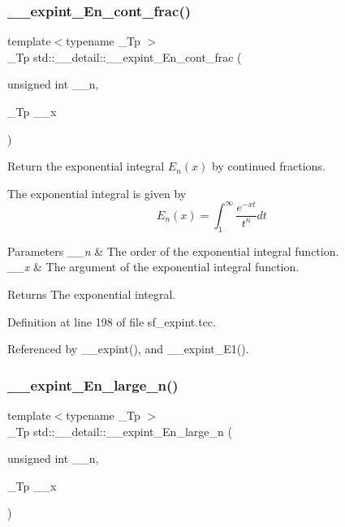 \subsubsection{\texorpdfstring{\+\_\+\+\_\+expint\+\_\+\+En\+\_\+cont\+\_\+frac()}{\_\_expint\_En\_cont\_frac()}}
{\footnotesize\ttfamily template$<$typename \+\_\+\+Tp $>$ \\
\+\_\+\+Tp std\+::\+\_\+\+\_\+detail\+::\+\_\+\+\_\+expint\+\_\+\+En\+\_\+cont\+\_\+frac (\begin{DoxyParamCaption}\item[{unsigned int}]{\+\_\+\+\_\+n,  }\item[{\+\_\+\+Tp}]{\+\_\+\+\_\+x }\end{DoxyParamCaption})}



Return the exponential integral $ E_n(x) $ by continued fractions. 

The exponential integral is given by \[ E_n(x) = \int_{1}^\infty \frac{e^{-xt}}{t^n} dt \]


\begin{DoxyParams}{Parameters}
{\em \+\_\+\+\_\+n} & The order of the exponential integral function. \\
\hline
{\em \+\_\+\+\_\+x} & The argument of the exponential integral function. \\
\hline
\end{DoxyParams}
\begin{DoxyReturn}{Returns}
The exponential integral. 
\end{DoxyReturn}


Definition at line 198 of file sf\+\_\+expint.\+tcc.



Referenced by \+\_\+\+\_\+expint(), and \+\_\+\+\_\+expint\+\_\+\+E1().

\mbox{\label{namespacestd_1_1____detail_a77400748c1315de9be10fa5e469df64b}} 
\subsubsection{\texorpdfstring{\+\_\+\+\_\+expint\+\_\+\+En\+\_\+large\+\_\+n()}{\_\_expint\_En\_large\_n()}}
{\footnotesize\ttfamily template$<$typename \+\_\+\+Tp $>$ \\
\+\_\+\+Tp std\+::\+\_\+\+\_\+detail\+::\+\_\+\+\_\+expint\+\_\+\+En\+\_\+large\+\_\+n (\begin{DoxyParamCaption}\item[{unsigned int}]{\+\_\+\+\_\+n,  }\item[{\+\_\+\+Tp}]{\+\_\+\+\_\+x }\end{DoxyParamCaption})}



